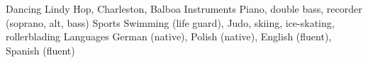 \begin{cvskills}
  \cvskill
    {Dancing}
    {Lindy Hop, Charleston, Balboa}
  \cvskill
    {Instruments}
    {Piano, double bass, recorder (soprano, alt, bass)}
  \cvskill
    {Sports}
    {Swimming (life guard), Judo, skiing, ice-skating, rollerblading}
  \cvskill
    {Languages}
    {German (native), Polish (native), English (fluent), Spanish (fluent)}
\end{cvskills}
